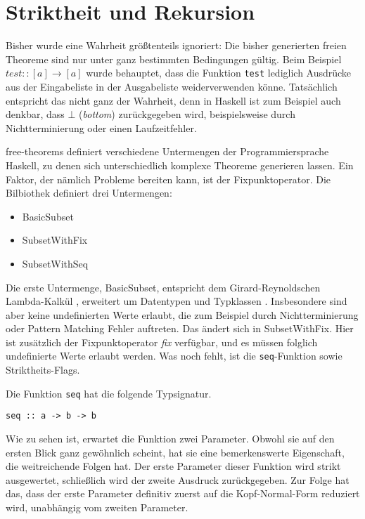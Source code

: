 \section{Striktheit und Rekursion}

\label{sec:striktheit-und-rekursion}

Bisher wurde eine Wahrheit größtenteils ignoriert: Die bisher generierten freien Theoreme sind nur unter ganz bestimmten
Bedingungen gültig. Beim Beispiel \texttt{$test :: [a] \rightarrow [a]$} wurde behauptet, dass die Funktion \texttt{test}
lediglich Ausdrücke aus der Eingabeliste in der Ausgabeliste weiderverwenden könne. Tatsächlich entspricht das nicht ganz der
Wahrheit, denn in Haskell ist zum Beispiel auch denkbar, dass $\bot$ (\textit{bottom}) zurückgegeben wird, beispielsweise
durch Nichtterminierung oder einen Laufzeitfehler.

free-theorems definiert verschiedene Untermengen der Programmiersprache Haskell, zu denen sich unterschiedlich komplexe
Theoreme generieren lassen. Ein Faktor, der nämlich Probleme bereiten kann, ist der Fixpunktoperator.
Die Bilbiothek definiert drei Untermengen:

\begin{itemize}
   \item BasicSubset
   \item SubsetWithFix
   \item SubsetWithSeq
\end{itemize}

Die erste Untermenge, BasicSubset, entspricht dem Girard-Reynoldschen Lambda-Kalkül \cite{freetheorems} , erweitert um Datentypen und
Typklassen \cite{freetheorems}. Insbesondere sind aber keine undefinierten Werte erlaubt, die zum Beispiel durch Nichtterminierung
oder Pattern Matching Fehler auftreten.
Das ändert sich in SubsetWithFix. Hier ist zusätzlich der Fixpunktoperator \textit{fix} verfügbar, und es müssen folglich undefinierte
Werte erlaubt werden. Was noch fehlt, ist die \texttt{seq}-Funktion sowie Striktheits-Flags.

Die Funktion \texttt{seq} hat die folgende Typsignatur.

\begin{verbatim}
seq :: a -> b -> b
\end{verbatim}

Wie zu sehen ist, erwartet die Funktion zwei Parameter. Obwohl sie auf den ersten Blick ganz gewöhnlich scheint, hat sie
eine bemerkenswerte Eigenschaft, die weitreichende Folgen hat. Der erste Parameter dieser Funktion wird strikt ausgewertet,
schließlich wird der zweite Ausdruck zurückgegeben. Zur Folge hat das, dass der erste Parameter definitiv zuerst auf die
Kopf-Normal-Form reduziert wird, unabhängig vom zweiten Parameter.

